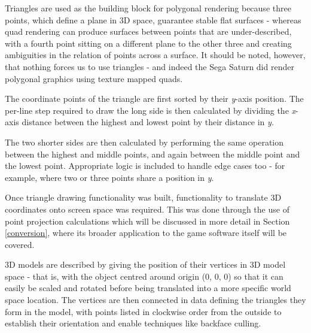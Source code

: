 \documentclass[11pt]{article}
\begin{document}
Triangles are used as the building block for polygonal rendering because three points, which define
a plane in 3D space, guarantee stable flat surfaces - whereas quad rendering can produce surfaces
between points that are under-described, with a fourth point sitting on a different plane to the
other three and creating ambiguities in the relation of points across a surface. It should be
noted, however, that nothing forces us to use triangles - and indeed the Sega Saturn did render
polygonal graphics using texture mapped quads.


The coordinate points of the triangle are first sorted by their \textit{y}-axis position. The
per-line step required to draw the long side is then calculated by dividing the \textit{x}-axis
distance between the highest and lowest point by their distance in \textit{y}.

The two shorter sides are then calculated by performing the same operation between the highest
and middle points, and again between the middle point and the lowest point. Appropriate logic is
included to handle edge cases too - for example, where two or three points share a position in
\textit{y}.


Once triangle drawing functionality was built, functionality to translate 3D coordinates onto
screen space was required. This was done through the use of point projection calculations which
will be discussed in more detail in Section \ref{conversion},
where its broader application to the game software itself will be covered.


3D models are described by giving the position of their vertices in 3D model space - that is,
with the object centred around origin (0, 0, 0) so that it can easily be scaled and rotated
before being translated into a more specific world space location. The vertices are then connected
in data defining the triangles they form in the model, with points listed in clockwise order from
the outside to establish their orientation and enable techniques like backface culling.




\end{document}
